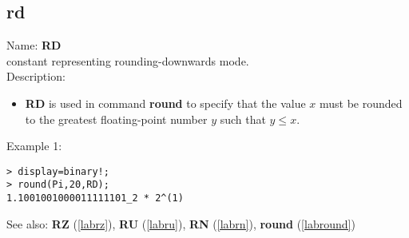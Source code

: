 \subsection{rd}
\label{labrd}
\noindent Name: \textbf{RD}\\
constant representing rounding-downwards mode.\\

\noindent Description: \begin{itemize}

\item \textbf{RD} is used in command \textbf{round} to specify that the value $x$ must be rounded
   to the greatest floating-point number $y$ such that $y \le x$.
\end{itemize}
\noindent Example 1: 
\begin{center}\begin{minipage}{15cm}\begin{Verbatim}[frame=single]
> display=binary!;
> round(Pi,20,RD);
1.1001001000011111101_2 * 2^(1)
\end{Verbatim}
\end{minipage}\end{center}
See also: \textbf{RZ} (\ref{labrz}), \textbf{RU} (\ref{labru}), \textbf{RN} (\ref{labrn}), \textbf{round} (\ref{labround})
